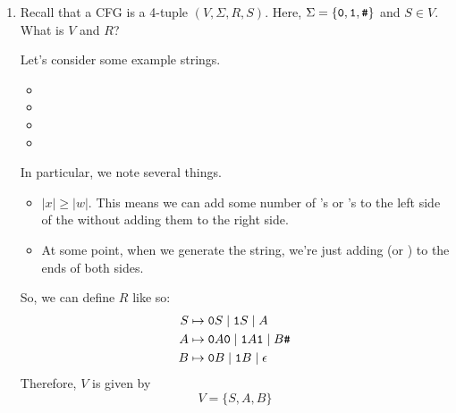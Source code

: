 \documentclass[letterpaper]{article}
\begin{document}
\begin{enumerate}
    \item Recall that a CFG is a 4-tuple $(V, \Sigma, R, S)$. Here, $\Sigma = \{\texttt{0}, \texttt{1}, \texttt{\#}\}$ and $S \in V$. What is $V$ and $R$?
    \begin{mdframed}[]
        Let's consider some example strings. 
        \begin{itemize}
            \item \code{\#}
            \item {}
            \item {}
            \item {}
        \end{itemize}
        In particular, we note several things. 
        \begin{itemize}
            \item $|x| \geq |w|$. This means we can add some number of 's or 's to the left side of the \code{\#} without adding them to the right side. 
            \item At some point, when we generate the string, we're just adding  (or ) to the ends of both sides. 
        \end{itemize}
        So, we can define $R$ like so: 
        \begin{equation*}
            \begin{aligned}
                S &\mapsto \texttt{0}S \mid \texttt{1}S \mid A \\ 
                A &\mapsto \texttt{0}A\texttt{0} \mid \texttt{1}A\texttt{1} \mid B\texttt{\#} \\ 
                B &\mapsto \texttt{0}B \mid \texttt{1}B \mid \epsilon
            \end{aligned}
        \end{equation*}
        Therefore, $V$ is given by 
        \[V = \{S, A, B\}\]
    \end{mdframed}


\end{enumerate}
\end{document}
